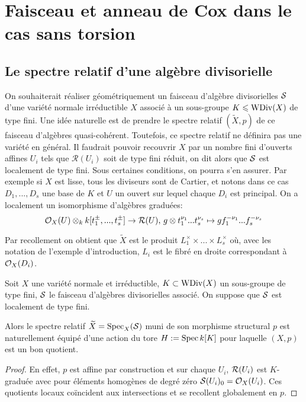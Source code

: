 \section{Faisceau et anneau de Cox dans le cas sans torsion}

\subsection{Le spectre relatif d'une algèbre divisorielle}

On souhaiterait réaliser géométriquement un faisceau d'algèbre divisorielles $\mathcal{S}$ d'une variété normale irréductible $X$ associé à un sous-groupe $K\leqslant \operatorname{WDiv}(X)$ de type fini. Une idée naturelle est de prendre le spectre relatif $(\widetilde{X}, p)$ de ce faisceau d'algèbres quasi-cohérent. Toutefois, ce spectre relatif ne définira pas une variété en général. Il faudrait pouvoir recouvrir $X$ par un nombre fini d'ouverts affines $U_i$ tels que $\mathcal{R}(U_i)$ soit de type fini réduit, on dit alors que $\mathcal{S}$ est localement de type fini. Sous certaines conditions, on pourra s'en assurer. Par exemple si $X$ est lisse, tous les diviseurs sont de Cartier, et notons dans ce cas $D_1,...,D_s$ une base de $K$ et $U$ un ouvert sur lequel chaque $D_i$ est principal. On a localement un isomorphisme d'algèbres graduées:
\begin{equation} \label{eq:1}
\mathcal{O}_X(U)\otimes_k k[t_1^{\pm},...,t_s^{\pm}] \rightarrow \mathcal{R}(U),\, g\otimes t_1^{\nu_1}...t_s^{\nu_s}\mapsto gf_1^{-\nu_1}...f_s^{-\nu_s}
\end{equation}

Par recollement on obtient que $\widetilde{X}$ est le produit $L_1^\times\times...\times L_s^\times$ où, avec les notation de l'exemple d'introduction, $L_i$ est le fibré en droite correspondant à $\mathcal{O}_X(D_i)$. 

\begin{cons}\label{specrelatifdivi}
Soit $X$ une variété normale et irréductible, $K\subset \operatorname{WDiv}(X)$ un sous-groupe de type fini, $\mathcal{S}$ le faisceau d'algèbres divisorielles associé. On suppose que $\mathcal{S}$ est localement de type fini.

Alors le spectre relatif $\widetilde{X}=\operatorname{Spec}_X(\mathcal{S})$ muni de son morphisme structural $p$ est naturellement équipé d'une action du tore $H:=\operatorname{Spec} k[K]$ pour laquelle $(X,p)$ est un bon quotient.
\end{cons}
\begin{proof}
En effet, $p$ est affine par construction et sur chaque $U_i$, $\mathcal{R}(U_i)$ est $K$-graduée avec pour éléments homogènes de degré zéro $\mathcal{S}(U_i)_0=\mathcal{O}_X(U_i)$. Ces quotients locaux coïncident aux intersections et se recollent globalement en $p$.
\end{proof}

